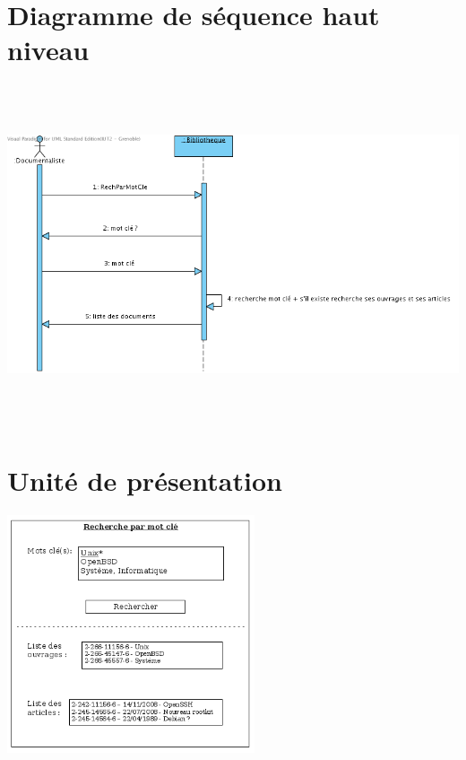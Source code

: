 \documentclass[a4paper,10pt]{report}
\begin{document}
\section*{Diagramme de séquence haut niveau}
\bigskip
\bigskip
\bigskip
\includegraphics[height=100mm]{RechParMotCleHautNiveau.png}

\newpage

\section*{Unité de présentation}
\includegraphics[height=70mm]{UpRechParMotCle.png}
\end{document}
